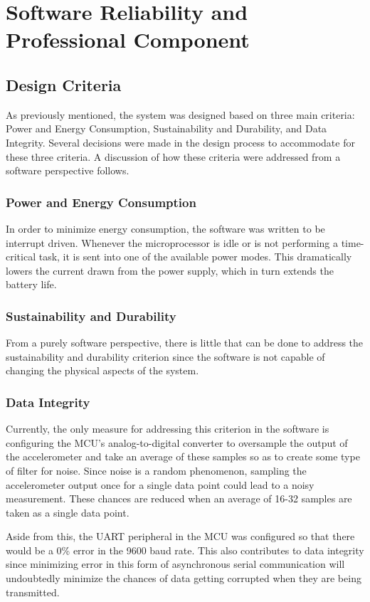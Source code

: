\section{Software Reliability and Professional Component}

\subsection{Design Criteria}
As previously mentioned, the system was designed based on three main criteria: Power and Energy Consumption, Sustainability and Durability, and Data Integrity.  Several decisions were made in the design process to accommodate for these three criteria.  A discussion of how these criteria were addressed from a software perspective follows.

\subsubsection{Power and Energy Consumption}
In order to minimize energy consumption, the software was written to be interrupt driven.  Whenever the microprocessor is idle or is not performing a time-critical task, it is sent into one of the available power modes.  This dramatically lowers the current drawn from the power supply, which in turn extends the battery life.

\subsubsection{Sustainability and Durability}
From a purely software perspective, there is little that can be done to address the sustainability and durability criterion since the software is not capable of changing the physical aspects of the system.

\subsubsection{Data Integrity}
Currently, the only measure for addressing this criterion in the software is configuring the MCU's analog-to-digital converter to oversample the output of the accelerometer and take an average of these samples so as to create some type of filter for noise.  Since noise is a random phenomenon, sampling the accelerometer output once for a single data point could lead to a noisy measurement.  These chances are reduced when an average of 16-32 samples are taken as a single data point.

Aside from this, the UART peripheral in the MCU was configured so that there would be a 0\% error in the 9600 baud rate.  This also contributes to data integrity since minimizing error in this form of asynchronous serial communication will undoubtedly minimize the chances of data getting corrupted when they are being transmitted.